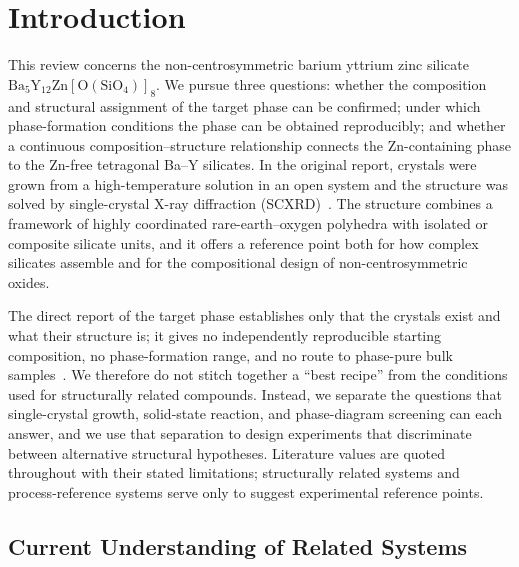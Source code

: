 \section{Introduction}
\label{sec:introduction}

This review concerns the non-centrosymmetric barium yttrium zinc silicate $\mathrm{Ba_5Y_{12}Zn[O(SiO_4)]_8}$. We pursue three questions: whether the composition and structural assignment of the target phase can be confirmed; under which phase-formation conditions the phase can be obtained reproducibly; and whether a continuous composition--structure relationship connects the Zn-containing phase to the Zn-free tetragonal Ba--Y silicates. In the original report, crystals were grown from a high-temperature solution in an open system and the structure was solved by single-crystal X-ray diffraction (SCXRD)~\cite{ababaikeri2024ba5y12zn}. The structure combines a framework of highly coordinated rare-earth--oxygen polyhedra with isolated or composite silicate units, and it offers a reference point both for how complex silicates assemble and for the compositional design of non-centrosymmetric oxides.

The direct report of the target phase establishes only that the crystals exist and what their structure is; it gives no independently reproducible starting composition, no phase-formation range, and no route to phase-pure bulk samples~\cite{ababaikeri2024ba5y12zn}. We therefore do not stitch together a ``best recipe'' from the conditions used for structurally related compounds. Instead, we separate the questions that single-crystal growth, solid-state reaction, and phase-diagram screening can each answer, and we use that separation to design experiments that discriminate between alternative structural hypotheses. Literature values are quoted throughout with their stated limitations; structurally related systems and process-reference systems serve only to suggest experimental reference points.

\subsection{Current Understanding of Related Systems}

